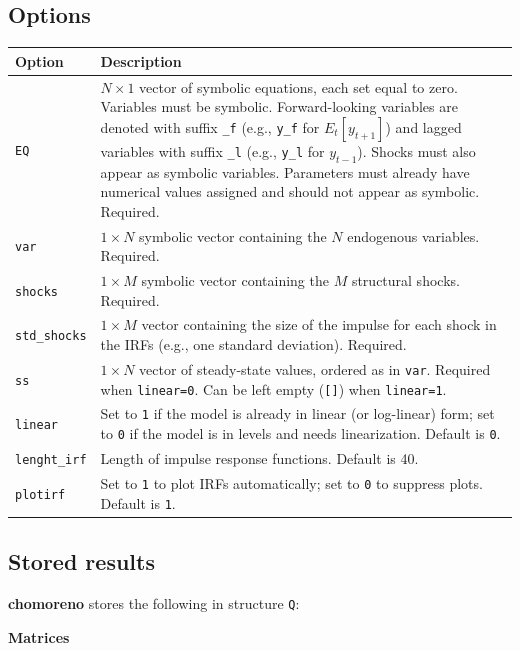 \documentclass{article}
\begin{document}
\subsection{Options}

\begin{longtable}[c]{p{2.8cm}p{11.2cm}}
\toprule
\textbf{Option} & \textbf{Description} \\
\midrule
\texttt{EQ} & $N \times 1$ vector of symbolic equations, each set equal to zero. Variables must be symbolic. Forward-looking variables are denoted with suffix \texttt{\_f} (e.g., \texttt{y\_f} for $E_t[y_{t+1}]$) and lagged variables with suffix \texttt{\_l} (e.g., \texttt{y\_l} for $y_{t-1}$). Shocks must also appear as symbolic variables. Parameters must already have numerical values assigned and should not appear as symbolic. Required. \\[0.3em]
\texttt{var} & $1 \times N$ symbolic vector containing the $N$ endogenous variables. Required. \\[0.3em]
\texttt{shocks} & $1 \times M$ symbolic vector containing the $M$ structural shocks. Required. \\[0.3em]
\texttt{std\_shocks} & $1 \times M$ vector containing the size of the impulse for each shock in the IRFs (e.g., one standard deviation). Required. \\[0.3em]
\texttt{ss} & $1 \times N$ vector of steady-state values, ordered as in \texttt{var}. Required when \texttt{linear=0}. Can be left empty (\texttt{[]}) when \texttt{linear=1}. \\[0.3em]
\texttt{linear} & Set to \texttt{1} if the model is already in linear (or log-linear) form; set to \texttt{0} if the model is in levels and needs linearization. Default is \texttt{0}. \\[0.3em]
\texttt{lenght\_irf} & Length of impulse response functions. Default is 40. \\[0.3em]
\texttt{plotirf} & Set to \texttt{1} to plot IRFs automatically; set to \texttt{0} to suppress plots. Default is \texttt{1}. \\[0.3em]
\bottomrule
\end{longtable}

\subsection{Stored results}

\textbf{chomoreno} stores the following in structure \texttt{Q}:

\medskip
\noindent\textbf{Matrices}
\end{document}
